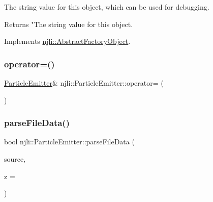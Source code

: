 The string value for this object, which can be used for debugging.

\begin{DoxyReturn}{Returns}
"The string value for this object. 
\end{DoxyReturn}


Implements \mbox{\hyperlink{classnjli_1_1_abstract_factory_object_a838f4fa7e65cace6098aab5222892942}{njli\+::\+Abstract\+Factory\+Object}}.

\mbox{\label{classnjli_1_1_particle_emitter_a53d9eff68b586bb1cfcf45ebf33712e9}} 
\subsubsection{\texorpdfstring{operator=()}{operator=()}}
{\footnotesize\ttfamily \mbox{\hyperlink{classnjli_1_1_particle_emitter}{Particle\+Emitter}}\& njli\+::\+Particle\+Emitter\+::operator= (\begin{DoxyParamCaption}\item[{const \mbox{\hyperlink{classnjli_1_1_particle_emitter}{Particle\+Emitter}} \&}]{ }\end{DoxyParamCaption})\hspace{0.3cm}{\ttfamily [protected]}}

\mbox{\label{classnjli_1_1_particle_emitter_ad64b84036b876f4d16a9f431d5644d90}} 
\subsubsection{\texorpdfstring{parse\+File\+Data()}{parseFileData()}}
{\footnotesize\ttfamily bool njli\+::\+Particle\+Emitter\+::parse\+File\+Data (\begin{DoxyParamCaption}\item[{const char $\ast$}]{source,  }\item[{const \mbox{\hyperlink{_util_8h_a5f6906312a689f27d70e9d086649d3fd}{f32}}}]{z = {} }\end{DoxyParamCaption})}


